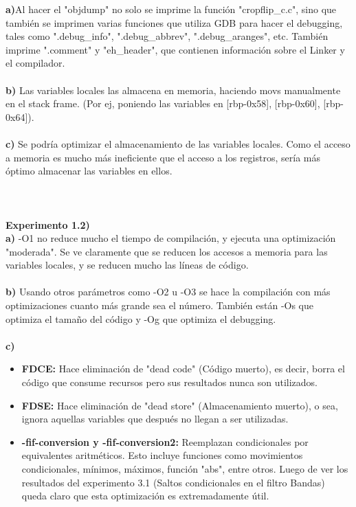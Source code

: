 \documentclass[a4paper]{article}
\begin{document}
\noindent \textbf{a)}Al hacer el "objdump" no solo se imprime la funci\'{o}n "cropflip\_c.c", sino que tambi\'{e}n se imprimen varias funciones que utiliza GDB para hacer el debugging, tales como ".debug\_info", ".debug\_abbrev", ".debug\_aranges", etc. Tambi\'{e}n imprime ".comment" y "eh\_header", que contienen informaci\'{o}n sobre el Linker y el compilador.\\ \\
 \textbf{b)} Las variables locales las almacena en memoria, haciendo movs manualmente en el stack frame. (Por ej, poniendo las variables en [rbp-0x58], [rbp-0x60], [rbp-0x64]).\\ \\
 \textbf{c)} Se podr\'{i}a optimizar el almacenamiento de las variables locales. Como el acceso a memoria es mucho m\'{a}s ineficiente que el acceso a los registros, ser\'{i}a más \'{o}ptimo almacenar las variables en ellos. \\ \\ \\ \\

\textbf{Experimento 1.2)}\\

\noindent \textbf{a)} -O1 no reduce mucho el tiempo de compilaci\'{o}n, y ejecuta una optimizaci\'{o}n "moderada". Se ve claramente que se reducen los accesos a memoria para las variables locales, y se reducen mucho las l\'{i}neas de c\'{o}digo.\\ \\
 \textbf{b)} Usando otros par\'{a}metros como -O2 u -O3 se hace la compilaci\'{o}n con más optimizaciones cuanto más grande sea el n\'{u}mero. Tambi\'{e}n est\'{a}n -Os que optimiza el tama\~{n}o del c\'{o}digo y -Og que optimiza el debugging.\\ \\



\noindent \textbf{c)}\\

\begin{itemize}

	\item \textbf{FDCE:} Hace eliminaci\'{o}n de "dead code" (C\'{o}digo muerto), es decir, borra el c\'{o}digo que consume recursos pero sus resultados nunca son utilizados.
	\item \textbf{FDSE:} Hace eliminaci\'{o}n de "dead store" (Almacenamiento muerto), o sea, ignora aquellas variables que despu\'{e}s no llegan a ser utilizadas. 
	\item \textbf{-fif-conversion y -fif-conversion2:} Reemplazan condicionales por equivalentes aritm\'{e}ticos. Esto incluye funciones como movimientos condicionales, m\'{i}nimos, m\'{a}ximos, funci\'{o}n "abs", entre otros. Luego de ver los resultados del experimento 3.1 (Saltos condicionales en el filtro Bandas) queda claro que esta optimizaci\'{o}n es extremadamente \'{u}til.

\end{itemize}
\end{document}
